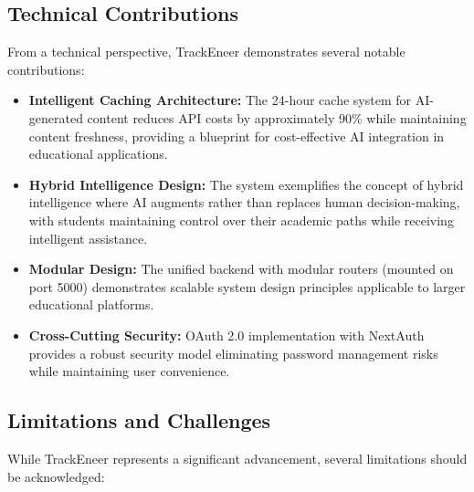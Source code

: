 \documentclass[12pt]{article}
\begin{document}
\subsection{Technical Contributions}
From a technical perspective, TrackEneer demonstrates several notable contributions:

\begin{itemize}
    \item \textbf{Intelligent Caching Architecture:} The 24-hour cache system for AI-generated content reduces API costs by approximately 90\% while maintaining content freshness, providing a blueprint for cost-effective AI integration in educational applications.
    
    \item \textbf{Hybrid Intelligence Design:} The system exemplifies the concept of hybrid intelligence where AI augments rather than replaces human decision-making, with students maintaining control over their academic paths while receiving intelligent assistance.
    
    \item \textbf{Modular Design:} The unified backend with modular routers (mounted on port 5000) demonstrates scalable system design principles applicable to larger educational platforms.
    
    \item \textbf{Cross-Cutting Security:} OAuth 2.0 implementation with NextAuth provides a robust security model eliminating password management risks while maintaining user convenience.
\end{itemize}

\subsection{Limitations and Challenges}
While TrackEneer represents a significant advancement, several limitations should be acknowledged:
\end{document}
